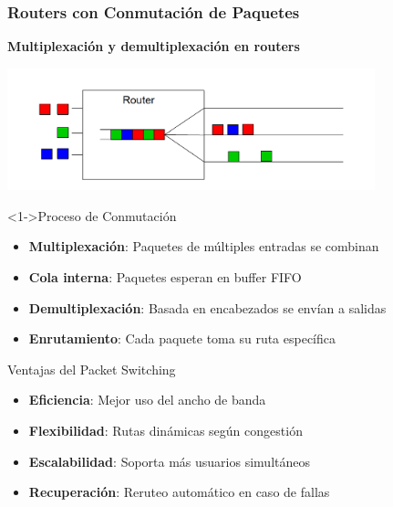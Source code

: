 \documentclass[aspectratio=169]{beamer}
\begin{document}
\begin{frame}
\frametitle{Routers con Conmutación de Paquetes}

\begin{center}
\Large \textbf{Multiplexación y demultiplexación en routers}
\end{center}

\begin{center}
\includegraphics[width=0.8\textwidth]{figuras/router.png}
\end{center}

\begin{block}<1->{Proceso de Conmutación}
\begin{itemize}
\item<1-> \textbf{Multiplexación}: Paquetes de múltiples entradas se combinan
\item<2-> \textbf{Cola interna}: Paquetes esperan en buffer FIFO
\item<3-> \textbf{Demultiplexación}: Basada en encabezados se envían a salidas
\item<4-> \textbf{Enrutamiento}: Cada paquete toma su ruta específica
\end{itemize}
\end{block}

\begin{block}{Ventajas del Packet Switching}
\begin{itemize}
\item<1-> \textbf{Eficiencia}: Mejor uso del ancho de banda
\item<2-> \textbf{Flexibilidad}: Rutas dinámicas según congestión
\item<3-> \textbf{Escalabilidad}: Soporta más usuarios simultáneos
\item<4-> \textbf{Recuperación}: Reruteo automático en caso de fallas
\end{itemize}
\end{block}
\end{frame}
\end{document}
